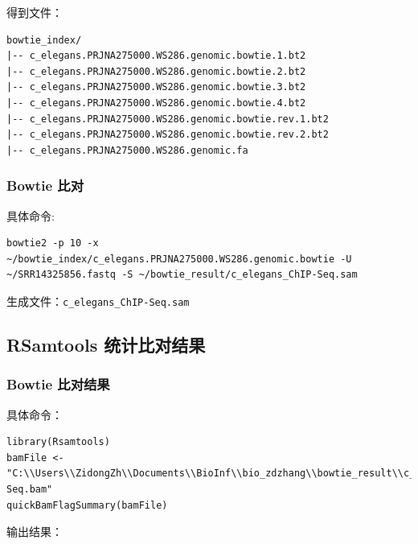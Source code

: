 \documentclass[UTF8]{ctexart}
\begin{document}
得到文件：

\begin{lstlisting}
bowtie_index/
|-- c_elegans.PRJNA275000.WS286.genomic.bowtie.1.bt2
|-- c_elegans.PRJNA275000.WS286.genomic.bowtie.2.bt2
|-- c_elegans.PRJNA275000.WS286.genomic.bowtie.3.bt2
|-- c_elegans.PRJNA275000.WS286.genomic.bowtie.4.bt2
|-- c_elegans.PRJNA275000.WS286.genomic.bowtie.rev.1.bt2
|-- c_elegans.PRJNA275000.WS286.genomic.bowtie.rev.2.bt2
|-- c_elegans.PRJNA275000.WS286.genomic.fa
\end{lstlisting}

\subsubsection{Bowtie 比对}

具体命令:

\begin{lstlisting}
bowtie2 -p 10 -x ~/bowtie_index/c_elegans.PRJNA275000.WS286.genomic.bowtie -U ~/SRR14325856.fastq -S ~/bowtie_result/c_elegans_ChIP-Seq.sam
\end{lstlisting}

生成文件：\verb|c_elegans_ChIP-Seq.sam|

\subsection{RSamtools 统计比对结果}

\subsubsection{Bowtie 比对结果}

具体命令：

\begin{lstlisting}
library(Rsamtools)
bamFile <- "C:\\Users\\ZidongZh\\Documents\\BioInf\\bio_zdzhang\\bowtie_result\\c_elegans_ChIP-Seq.bam"
quickBamFlagSummary(bamFile)
\end{lstlisting}

输出结果：
\end{document}
